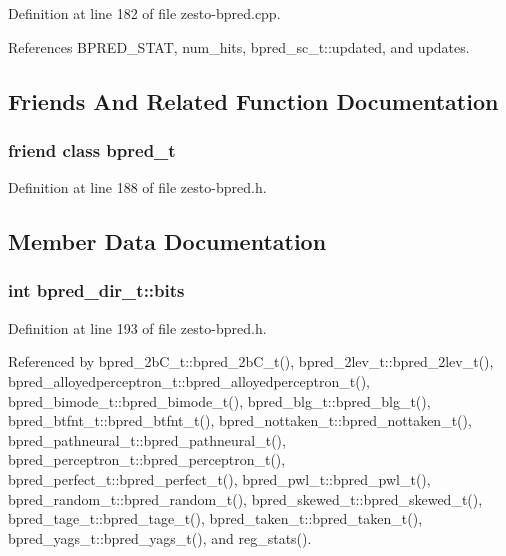 Definition at line 182 of file zesto-bpred.cpp.

References BPRED\_\-STAT, num\_\-hits, bpred\_\-sc\_\-t::updated, and updates.

\subsection{Friends And Related Function Documentation}
\subsubsection[{bpred\_\-t}]{\setlength{\rightskip}{0pt plus 5cm}friend class {\bf bpred\_\-t}\hspace{0.3cm}{\tt  [friend]}}\label{classbpred__dir__t_44319d3cf67079457eb46e2c6fcfeb49}




Definition at line 188 of file zesto-bpred.h.

\subsection{Member Data Documentation}
\subsubsection[{bits}]{\setlength{\rightskip}{0pt plus 5cm}int {\bf bpred\_\-dir\_\-t::bits}\hspace{0.3cm}{\tt  [protected]}}\label{classbpred__dir__t_43d45896b2fa5c0aa4cbc20239785981}




Definition at line 193 of file zesto-bpred.h.

Referenced by bpred\_\-2bC\_\-t::bpred\_\-2bC\_\-t(), bpred\_\-2lev\_\-t::bpred\_\-2lev\_\-t(), bpred\_\-alloyedperceptron\_\-t::bpred\_\-alloyedperceptron\_\-t(), bpred\_\-bimode\_\-t::bpred\_\-bimode\_\-t(), bpred\_\-blg\_\-t::bpred\_\-blg\_\-t(), bpred\_\-btfnt\_\-t::bpred\_\-btfnt\_\-t(), bpred\_\-nottaken\_\-t::bpred\_\-nottaken\_\-t(), bpred\_\-pathneural\_\-t::bpred\_\-pathneural\_\-t(), bpred\_\-perceptron\_\-t::bpred\_\-perceptron\_\-t(), bpred\_\-perfect\_\-t::bpred\_\-perfect\_\-t(), bpred\_\-pwl\_\-t::bpred\_\-pwl\_\-t(), bpred\_\-random\_\-t::bpred\_\-random\_\-t(), bpred\_\-skewed\_\-t::bpred\_\-skewed\_\-t(), bpred\_\-tage\_\-t::bpred\_\-tage\_\-t(), bpred\_\-taken\_\-t::bpred\_\-taken\_\-t(), bpred\_\-yags\_\-t::bpred\_\-yags\_\-t(), and reg\_\-stats().
